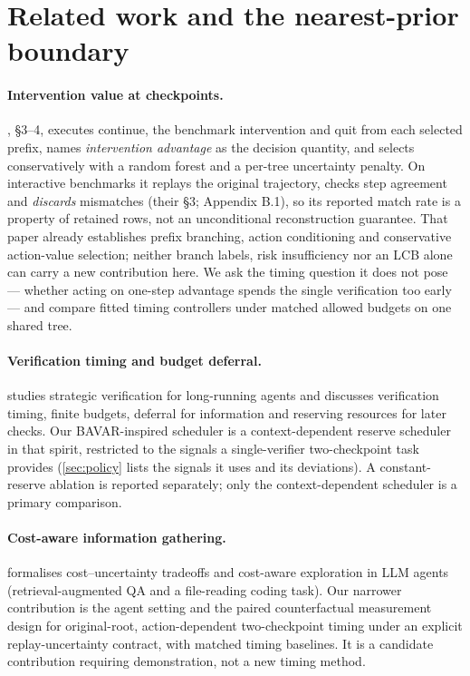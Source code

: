 \section{Related work and the nearest-prior boundary}
\label{sec:related}

\paragraph{Intervention value at checkpoints.}
, \S3--4, executes continue, the benchmark
intervention and quit from each selected prefix, names \emph{intervention
advantage} as the decision quantity, and selects conservatively with a random
forest and a per-tree uncertainty penalty.  On interactive benchmarks it replays
the original trajectory, checks step agreement and \emph{discards} mismatches
(their \S3; Appendix B.1), so its reported match rate is a property of retained
rows, not an unconditional reconstruction guarantee.  That paper already
establishes prefix branching, action conditioning and conservative
action-value selection; neither branch labels, risk insufficiency nor an LCB
alone can carry a new contribution here.  We ask the timing question it does not
pose --- whether acting on one-step advantage spends the single verification too
early --- and compare fitted timing controllers under matched allowed budgets on
one shared tree.

\paragraph{Verification timing and budget deferral.}
 studies strategic verification for long-running agents and
discusses verification timing, finite budgets, deferral for information and
reserving resources for later checks.  Our BAVAR-inspired scheduler is a
context-dependent reserve scheduler in that spirit, restricted to the signals a
single-verifier two-checkpoint task provides (\cref{sec:policy} lists the
signals it uses and its deviations).  A constant-reserve ablation is reported
separately; only the context-dependent scheduler is a primary comparison.

\paragraph{Cost-aware information gathering.}
 formalises cost--uncertainty tradeoffs and
cost-aware exploration in LLM agents (retrieval-augmented QA and a file-reading
coding task).  Our narrower contribution is the agent setting and the paired
counterfactual measurement design for original-root, action-dependent
two-checkpoint timing under an explicit replay-uncertainty contract, with
matched timing baselines.  It is a candidate contribution requiring
demonstration, not a new timing method.


